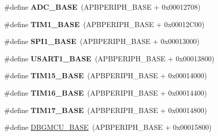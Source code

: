 \begin{DoxyCompactItemize}
\item 
\mbox{\label{group___peripheral__memory__map_gad06cb9e5985bd216a376f26f22303cd6}} 
\#define {\bfseries A\+D\+C\+\_\+\+B\+A\+SE}~(A\+P\+B\+P\+E\+R\+I\+P\+H\+\_\+\+B\+A\+SE + 0x00012708)
\item 
\mbox{\label{group___peripheral__memory__map_gaf8aa324ca5011b8173ab16585ed7324a}} 
\#define {\bfseries T\+I\+M1\+\_\+\+B\+A\+SE}~(A\+P\+B\+P\+E\+R\+I\+P\+H\+\_\+\+B\+A\+SE + 0x00012\+C00)
\item 
\mbox{\label{group___peripheral__memory__map_ga50cd8b47929f18b05efbd0f41253bf8d}} 
\#define {\bfseries S\+P\+I1\+\_\+\+B\+A\+SE}~(A\+P\+B\+P\+E\+R\+I\+P\+H\+\_\+\+B\+A\+SE + 0x00013000)
\item 
\mbox{\label{group___peripheral__memory__map_ga86162ab3f740db9026c1320d46938b4d}} 
\#define {\bfseries U\+S\+A\+R\+T1\+\_\+\+B\+A\+SE}~(A\+P\+B\+P\+E\+R\+I\+P\+H\+\_\+\+B\+A\+SE + 0x00013800)
\item 
\mbox{\label{group___peripheral__memory__map_ga7ab42ce1846930569d742d339b554078}} 
\#define {\bfseries T\+I\+M15\+\_\+\+B\+A\+SE}~(A\+P\+B\+P\+E\+R\+I\+P\+H\+\_\+\+B\+A\+SE + 0x00014000)
\item 
\mbox{\label{group___peripheral__memory__map_ga16c97093a531d763b0794c3e6d09e1bf}} 
\#define {\bfseries T\+I\+M16\+\_\+\+B\+A\+SE}~(A\+P\+B\+P\+E\+R\+I\+P\+H\+\_\+\+B\+A\+SE + 0x00014400)
\item 
\mbox{\label{group___peripheral__memory__map_gaffbedbe30e8c4cffdea326d6c1800574}} 
\#define {\bfseries T\+I\+M17\+\_\+\+B\+A\+SE}~(A\+P\+B\+P\+E\+R\+I\+P\+H\+\_\+\+B\+A\+SE + 0x00014800)
\item 
\#define \hyperlink{group___peripheral__memory__map_ga4adaf4fd82ccc3a538f1f27a70cdbbef}{D\+B\+G\+M\+C\+U\+\_\+\+B\+A\+SE}~(A\+P\+B\+P\+E\+R\+I\+P\+H\+\_\+\+B\+A\+SE + 0x00015800)
\item 
\mbox{\label{group___peripheral__memory__map_gab2d8a917a0e4ea99a22ac6ebf279bc72}} 

\end{DoxyCompactItemize}
